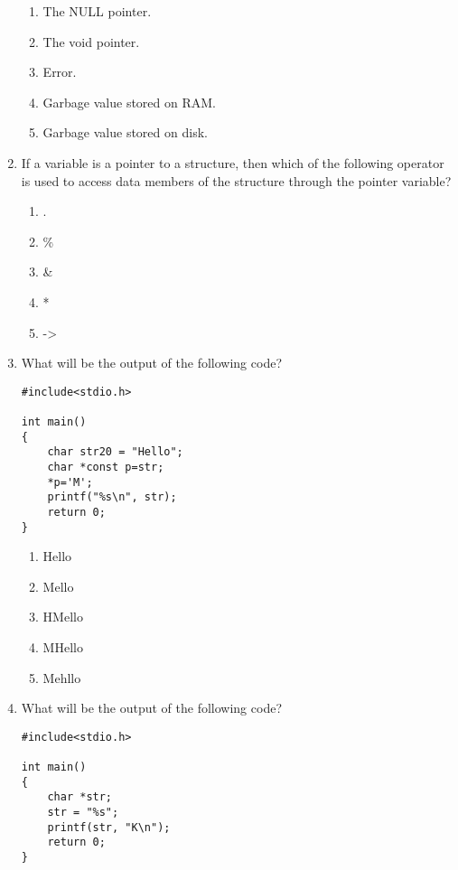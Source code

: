 \documentclass{article}
\begin{document}
\begin{enumerate}
            \begin{enumerate}
                \item The NULL pointer.
                \item The void pointer.
                \item Error.
                \item Garbage value stored on RAM.
                \item Garbage value stored on disk.
            \end{enumerate}
\item If a variable is a pointer to a structure, then which of the following operator is used to access data members of the structure through the pointer variable?
    
            \begin{enumerate}
                \item .
                \item \%
                \item \&
                \item *
                \item ->
            \end{enumerate}
\item What will be the output of the following code?

            \begin{verbatim}
#include<stdio.h>

int main()
{
    char str20 = "Hello";
    char *const p=str;
    *p='M';
    printf("%s\n", str);
    return 0;
}
            \end{verbatim}
    
            \begin{enumerate}
                \item Hello
                \item Mello
                \item HMello
                \item MHello
                \item Mehllo
            \end{enumerate}

    
\item What will be the output of the following code?

            \begin{verbatim}
#include<stdio.h>

int main()
{
    char *str;
    str = "%s";
    printf(str, "K\n");
    return 0;
}
            \end{verbatim}
    

\end{enumerate}
\end{document}

